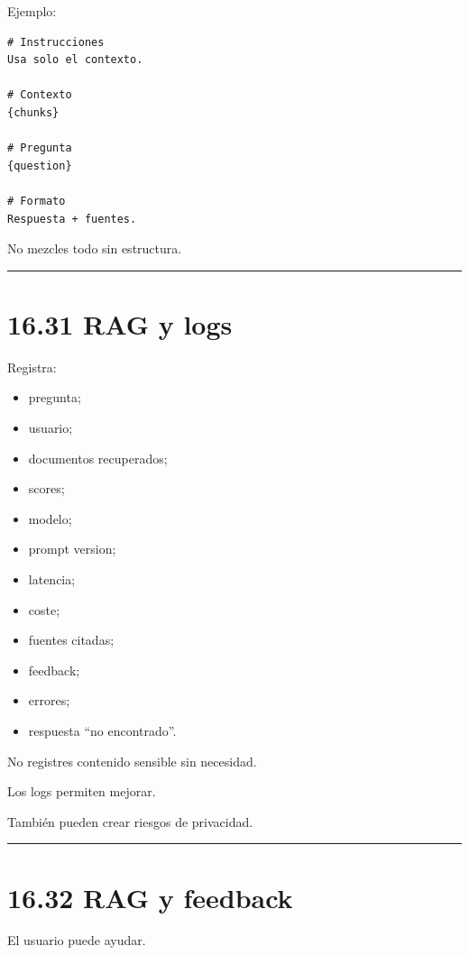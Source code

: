 Ejemplo:

\begin{lstlisting}
# Instrucciones
Usa solo el contexto.

# Contexto
{chunks}

# Pregunta
{question}

# Formato
Respuesta + fuentes.
\end{lstlisting}

No mezcles todo sin estructura.

\begin{center}\rule{0.5\linewidth}{0.5pt}\end{center}

\section{16.31 RAG y logs}\label{rag-y-logs}

Registra:

\begin{itemize}
\tightlist
\item
  pregunta;
\item
  usuario;
\item
  documentos recuperados;
\item
  scores;
\item
  modelo;
\item
  prompt version;
\item
  latencia;
\item
  coste;
\item
  fuentes citadas;
\item
  feedback;
\item
  errores;
\item
  respuesta ``no encontrado''.
\end{itemize}

No registres contenido sensible sin necesidad.

Los logs permiten mejorar.

También pueden crear riesgos de privacidad.

\begin{center}\rule{0.5\linewidth}{0.5pt}\end{center}

\section{16.32 RAG y feedback}\label{rag-y-feedback}

El usuario puede ayudar.

